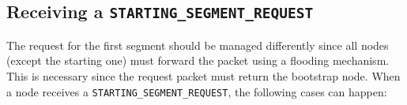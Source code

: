 
\subsection{Receiving a \texttt{STARTING\_SEGMENT\_REQUEST}}

The request for the first segment should be managed differently since
all nodes (except the starting one) must forward the packet using a
flooding mechanism. This is necessary since the request packet must
return the bootstrap node.
When a node receives a \texttt{STARTING\_SEGMENT\_REQUEST}, the
following cases can happen:

